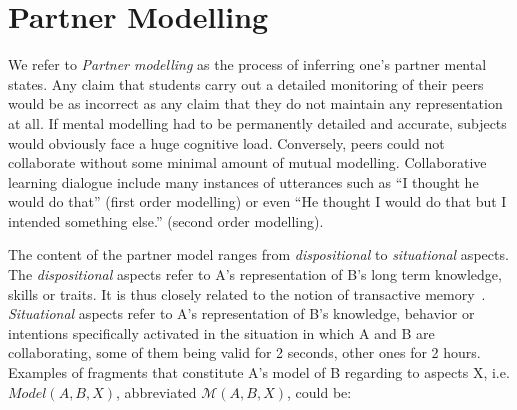 \documentclass[natbib]{svjour3}
\newcommand{\ie}{i.e.\xspace}
\newcommand{\A}{A\xspace}
\newcommand{\B}{B\xspace}
\newcommand{\model}[3]{{$\mathcal{M}(#1, #2, #3)$}}
\begin{document}
 







\section{Partner Modelling}

We refer to \emph{Partner modelling} as the process of inferring one's partner
mental states. Any claim that students carry out a detailed monitoring of their
peers would be as incorrect as any claim that they do not maintain any
representation at all. If mental modelling had to be permanently detailed and
accurate, subjects would obviously face a huge cognitive load. Conversely, peers
could not collaborate without some minimal amount of mutual modelling.
Collaborative learning dialogue include many instances of utterances such as ``I
thought he would do that'' (first order modelling) or even ``He
thought I would do that but I intended something else.'' (second order
modelling).


The content of the partner model ranges from \emph{dispositional} to
\emph{situational} aspects. The \emph{dispositional} aspects refer to \A's
representation of \B's long term knowledge, skills or traits. It is thus closely
related to the notion of transactive memory~\citep{wegner1987transactive,
moreland1999transactive}.  \emph{Situational} aspects refer to \A's representation of
B's knowledge, behavior or intentions specifically activated in the situation in
which \A and \B are collaborating, some of them being valid for 2 seconds, other
ones for 2 hours. Examples of fragments that constitute \A's model of B
regarding to aspects X, \ie $Model(A,B,X)$, abbreviated \model{A}{B}{X}, could be:
\end{document}
